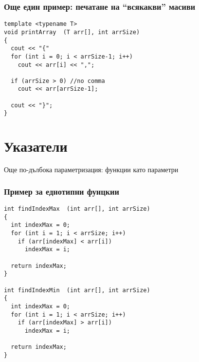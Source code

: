 \documentclass{beamer}
\begin{document}
\begin{frame}[fragile]
\frametitle{Още един пример: печатане на ``всякакви'' масиви}


\begin{flushleft}
\begin{lstlisting}
template <typename T>
void printArray  (T arr[], int arrSize)
{
  cout << "{"
  for (int i = 0; i < arrSize-1; i++)
    cout << arr[i] << ",";

  if (arrSize > 0) //no comma
    cout << arr[arrSize-1];

  cout << "}";
}
\end{lstlisting}  
\end{flushleft}

\end{frame}

\section{Указатели} 

\begin{frame}
\centerline{Още по-дълбока параметризация: функции като параметри}
\end{frame}

\begin{frame}[fragile]
\frametitle{Пример за еднотипни фунцкии}

\begin{flushleft}
\begin{lstlisting}
int findIndexMax  (int arr[], int arrSize)
{
  int indexMax = 0;
  for (int i = 1; i < arrSize; i++)
    if (arr[indexMax] < arr[i])
      indexMax = i;

  return indexMax;
}

int findIndexMin  (int arr[], int arrSize)
{
  int indexMax = 0;
  for (int i = 1; i < arrSize; i++)
    if (arr[indexMax] > arr[i])
      indexMax = i;

  return indexMax;
}

\end{lstlisting}  
\end{flushleft}

\end{frame}
\end{document}
